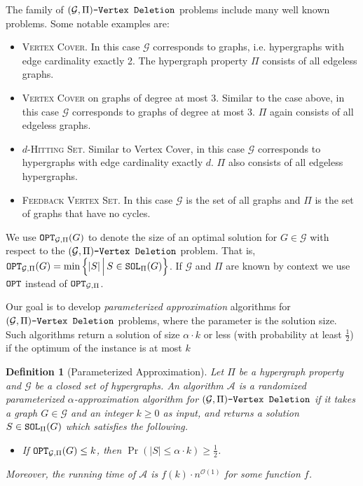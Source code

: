 \documentclass[letterpaper,11pt]{article}
\newcommand{\abs}[1]{{\left| #1\right|}}
\newcommand{\1}[1]{\mathds{1}\left[#1\right]}
\newcommand{\sat}{\textnormal{\texttt{SOL}}}
\newcommand{\OPT}{\textnormal{\texttt{OPT}}}
\newcommand{\Oh}{\mathcal{O}}
\newtheorem{definition}[theorem]{Definition}
\newcommand{\gpivd}[1][\mathcal{G},\Pi]{(#1)\textnormal{\texttt{-Vertex Deletion}}}
\newcommand{\cG}{\mathcal{G}}
\newcommand{\vc}{\textsc{Vertex Cover}\xspace}
\newcommand{\hs}[1]{\ensuremath{#1}\textsc{-Hitting Set}\xspace}
\newcommand{\fvs}{\textsc{Feedback Vertex Set}\xspace}
\begin{document}
The family of $\gpivd$ problems include many well known problems. Some notable examples are:
\begin{itemize}
	\item \vc. In this case $\mathcal{G}$ corresponds to graphs, i.e. hypergraphs with edge cardinality exactly 2. The hypergraph property $\Pi$ consists of all edgeless graphs.
	\item \vc on graphs of degree at most 3. Similar to the case above, in this case $\mathcal{G}$ corresponds to graphs of degree at most 3. $\Pi$ again consists of all edgeless graphs.
	\item \hs{d}. Similar to Vertex Cover, in this case $\mathcal{G}$ corresponds to hypergraphs with edge cardinality exactly $d$. $\Pi$ also consists of all edgeless hypergraphs.
	\item \fvs. In this case $\mathcal{G}$ is the set of all graphs and $\Pi$ is the set of graphs that have no cycles.
\end{itemize}

We use $\OPT_{\cG,\Pi}(G)$ to denote the size of an optimal solution for $G\in \cG$ with respect to the $\gpivd$ problem. That is, $\OPT_{\cG,\Pi}(G) = \min\Big\{ \abs{S}\,\Big|\,S \in \sat_{\Pi}(G) \Big\}$.  If $\cG$ and $\Pi$ are known by context we use $\OPT$ instead of $\OPT_{\cG,\Pi}$. 

Our goal is to develop {\em parameterized approximation} algorithms for $\gpivd$ problems, where the parameter is the solution size.  Such algorithms return a solution of size $\alpha \cdot k$ or less (with probability at least $\frac{1}{2}$) if the optimum of the instance is at most $k$
\begin{definition}[Parameterized Approximation]
	\label{definition:alpha_approx}
	Let $\Pi$ be a hypergraph property and $\mathcal{G}$ be a closed set of hypergraphs. 
	An algorithm $\mathcal{A}$ is a {\em randomized parameterized $\alpha$-approximation algorithm} for $\gpivd$  if it takes a graph $G \in \mathcal{G}$ and an integer $k \geq 0$ as input, and returns  a solution $S\in \sat_{\Pi}(G)$ which satisfies the following.
	\begin{itemize}
		\item If $\OPT_{\cG,\Pi}(G) \leq k$,  then $\Pr\left( \abs{S}\leq \alpha \cdot k \right) \geq \frac{1}{2}$.
	\end{itemize}
	Moreover, the running time of $\mathcal{A}$ is $f(k) \cdot n^{\Oh(1)}$ for some function $f$.
\end{definition}
\end{document}

